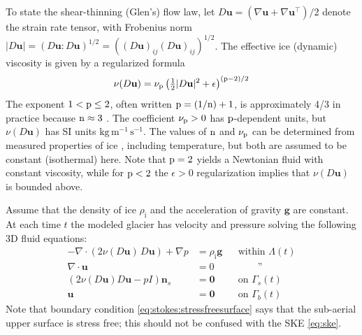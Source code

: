 \documentclass[hidelinks,onefignum,onetabnum,final]{siamart220329}  %
\newcommand{\eps}{\epsilon}
\newcommand{\grad}{\nabla}
\newcommand{\bg}{\mathbf{g}}
\newcommand{\bn}{\mathbf{n}}
\newcommand{\bu}{\mathbf{u}}
\newcommand{\bzero}{\bm{0}}
\newcommand{\nn}{{\text{\textnormal{n}}}}
\newcommand{\pp}{{\text{\textnormal{p}}}}
\newcommand{\rhoi}{\rho_{\text{i}}}
\begin{document}
To state the shear-thinning (Glen's) flow law, let $D\bu=(\grad \bu + \grad \bu^{\top})/2$ denote the strain rate tensor, with Frobenius norm $|D\bu| = (D\bu:D\bu)^{1/2} = \left((D\bu)_{ij} (D\bu)_{ij}\right)^{1/2}$.  The effective ice (dynamic) viscosity \cite{GreveBlatter2009} is given by a regularized formula
\begin{equation}
\nu(D\bu) = \nu_\pp \left(\tfrac{1}{2} |D\bu|^2 + \eps\right)^{(\pp-2)/2} \label{eq:glen}
\end{equation}
The exponent $1 < \pp \le 2$, often written $\pp=(1/\nn)+1$, is approximately 4/3 in practice because $\nn\approx 3$ \cite{GreveBlatter2009}.  The coefficient $\nu_\pp>0$ has $\pp$-dependent units, but $\nu(D\bu)$ has SI units $\text{kg}\,\text{m}^{-1}\,\text{s}^{-1}$.  The values of $\nn$ and $\nu_\pp$ can be determined from measured properties of ice \cite{GoldsbyKohlstedt2001,GreveBlatter2009}, including temperature, but both are assumed to be constant (isothermal) here.  Note that $\pp=2$ yields a Newtonian fluid with constant viscosity, while for $\pp < 2$ the $\eps>0$ regularization implies that $\nu(D\bu)$ is bounded above.

Assume that the density of ice $\rhoi$ and the acceleration of gravity $\bg$ are constant.  At each time $t$ the modeled glacier has velocity and pressure solving the following 3D fluid equations:
\begin{subequations}
\label{eq:stokes}
\begin{align}
- \nabla \cdot \left(2 \nu(D\bu)\, D\bu\right) + \nabla p &= \rhoi \bg && \text{within $\Lambda(t)$} \\
\nabla \cdot \bu &= 0 && \qquad \text{''} \label{eq:stokes:incomp} \\
\left(2 \nu(D\bu) D\bu - pI\right) \bn_s &= \bzero && \text{on $\Gamma_s(t)$}\label{eq:stokes:stressfreesurface} \\
\bu  &= \bzero && \text{on $\Gamma_b(t)$} \label{eq:stokes:noslide}
\end{align}
\end{subequations}
Note that boundary condition \eqref{eq:stokes:stressfreesurface} says that the sub-aerial upper surface is stress free; this should not be confused with the SKE \eqref{eq:ske}.
\end{document}
